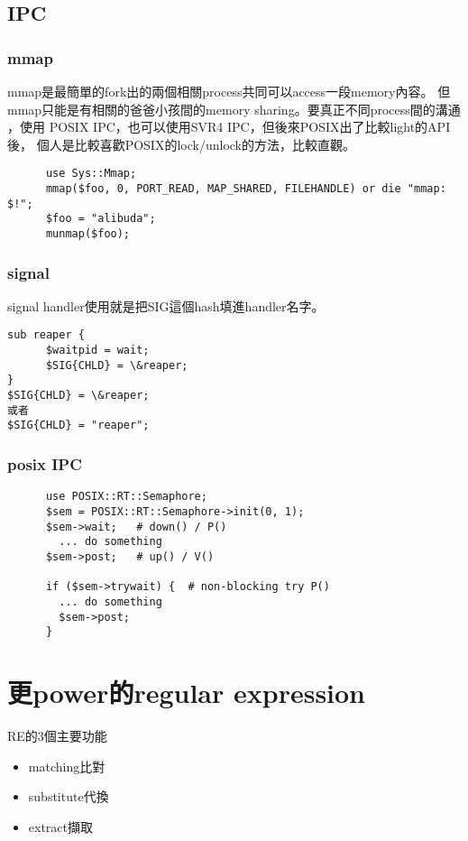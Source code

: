       
      \subsection{IPC}
      \subsubsection{mmap}
      mmap是最簡單的fork出的兩個相關process共同可以access一段memory內容。
      但mmap只能是有相關的爸爸小孩間的memory sharing。要真正不同process間的溝通
      ，使用 POSIX IPC，也可以使用SVR4 IPC，但後來POSIX出了比較light的API後，
      個人是比較喜歡POSIX的lock/unlock的方法，比較直觀。
      \begin{verbatim}
      use Sys::Mmap;
      mmap($foo, 0, PORT_READ, MAP_SHARED, FILEHANDLE) or die "mmap: $!";
      $foo = "alibuda";
      munmap($foo);
      \end{verbatim}

      \subsubsection{signal}
      signal handler使用就是把SIG這個hash填進handler名字。
      \begin{verbatim}
sub reaper {
      $waitpid = wait;
      $SIG{CHLD} = \&reaper;
}
$SIG{CHLD} = \&reaper;
或者
$SIG{CHLD} = "reaper";
      \end{verbatim}
      \subsubsection{posix IPC}
      \begin{verbatim}
      use POSIX::RT::Semaphore;
      $sem = POSIX::RT::Semaphore->init(0, 1);
      $sem->wait;   # down() / P()
        ... do something
      $sem->post;   # up() / V()

      if ($sem->trywait) {  # non-blocking try P()
        ... do something
        $sem->post;
      }
      \end{verbatim}

    \section{更power的regular expression}
    RE的3個主要功能 
    \begin{itemize}
    \item matching比對
    \item substitute代換
    \item extract擷取
    \end{itemize}
